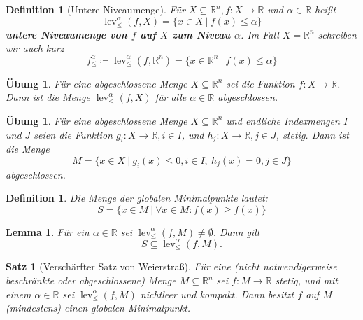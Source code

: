 \documentclass[11pt]{scrreprt}
\newcounter{thm}
\numberwithin{thm}{section}
\newtheorem{definition}[thm]{Definition}
\newtheorem{satz}[thm]{Satz}
\newtheorem{uebung}[thm]{Übung}
\newtheorem{uebung}[thm]{Übung}
\newtheorem{lemma}[thm]{Lemma}
\newtheorem*{definition*}{Definition}
\begin{document}
\begin{definition}[Untere Niveaumenge]
	Für $X \subseteq \mathbb{R}^n, f \colon X \rightarrow \mathbb{R}$ und $\alpha \in \mathbb{R}$ heißt
	$$ \operatorname{lev}_{\leq}^{\alpha}(f, X) = \big\{ x \in X ~|~ f(x) \leq \alpha \big\} $$
	\textbf{untere Niveaumenge von $f$ auf $X$ zum Niveau $\alpha$}. Im Fall $X = \mathbb{R}^n$ schreiben wir auch kurz
	$$ f_{\leq}^{\alpha} \coloneqq \operatorname{lev}_{\leq}^{\alpha}(f, \mathbb{R}^n) = \big\{ x \in \mathbb{R}^n ~|~ f(x) \leq \alpha \big\} $$
\end{definition}

\setcounter{thm}{9}

\begin{uebung}
	Für eine abgeschlossene Menge $X \subseteq \mathbb{R}^n$ sei die Funktion $f \colon X \rightarrow \mathbb{R}$. Dann ist die Menge $\operatorname{lev}_{\leq}^{\alpha}(f, X)$ für alle $\alpha \in \mathbb{R}$ abgeschlossen.	
\end{uebung}

\begin{uebung}
	Für eine abgeschlossene Menge $X \subseteq \mathbb{R}^n$ und endliche Indexmengen $I$ und $J$ seien die Funktion $g_i \colon X \rightarrow \mathbb{R}, i \in I$, und $h_j \colon X \rightarrow \mathbb{R}, j \in J$, stetig. Dann ist die Menge 
		$$ M = \big\{ x \in X ~|~g_i(x) \leq 0, i \in I, ~ h_j(x) = 0, j \in J \big\} $$
		abgeschlossen.	
\end{uebung}

\begin{definition*}
	Die Menge der globalen Minimalpunkte lautet:
	$$ S = \big\{ \overline{x} \in M ~|~ \forall x \in M: f(x) \geq f(\overline{x}) \big\} $$
\end{definition*}

\begin{lemma}
	Für ein $\alpha \in \mathbb{R}$ sei $\operatorname{lev}_{\leq}^{\alpha}(f, M) \neq \emptyset$. Dann gilt 
	$$ S \subseteq \operatorname{lev}_{\leq}^{\alpha}(f, M). $$
\end{lemma}

\begin{satz}[Verschärfter Satz von Weierstraß]
	Für eine (nicht notwendigerweise beschränkte oder abgeschlossene) Menge $M \subseteq \mathbb{R}^n$ sei $f \colon M \rightarrow \mathbb{R}$ stetig, und mit einem $\alpha \in \mathbb{R}$ sei $\operatorname{lev}_{\leq}^{\alpha}(f, M)$ nichtleer und kompakt. Dann besitzt $f$ auf $M$ (mindestens) einen globalen Minimalpunkt.
\end{satz}
\end{document}
